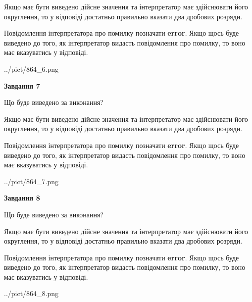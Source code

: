 \documentclass[12pt, ukrainian]{article}
\begin{document}
{\begin {Large}
Якщо має бути виведено дійсне значення та інтерпретатор має здійснювати його округлення, 
то у відповіді достатньо правильно вказати два дробових розряди.

Повідомлення інтерпретатора про помилку позначати \textbf{error}.
Якщо щось буде виведено до того, як інтерпретатор видасть повідомлення про помилку, 
то воно має вказуватись у відповіді. \par

\begin{center}
	{../pict/864_6.png}
\end{center}
\newpage

{\begin {center}\textbf{Завдання 7}\end {center}}\par
Що буде виведено за виконання? \par

Якщо має бути виведено дійсне значення та інтерпретатор має здійснювати його округлення, 
то у відповіді достатньо правильно вказати два дробових розряди.

Повідомлення інтерпретатора про помилку позначати \textbf{error}.
Якщо щось буде виведено до того, як інтерпретатор видасть повідомлення про помилку, 
то воно має вказуватись у відповіді. \par

\begin{center}
	{../pict/864_7.png}
\end{center}
\newpage

{\begin {center}\textbf{Завдання 8}\end {center}}\par
Що буде виведено за виконання? \par

Якщо має бути виведено дійсне значення та інтерпретатор має здійснювати його округлення, 
то у відповіді достатньо правильно вказати два дробових розряди.

Повідомлення інтерпретатора про помилку позначати \textbf{error}.
Якщо щось буде виведено до того, як інтерпретатор видасть повідомлення про помилку, 
то воно має вказуватись у відповіді. \par

\begin{center}
	{../pict/864_8.png}
\end{center}
\newpage


\end{Large}}
\end{document}
